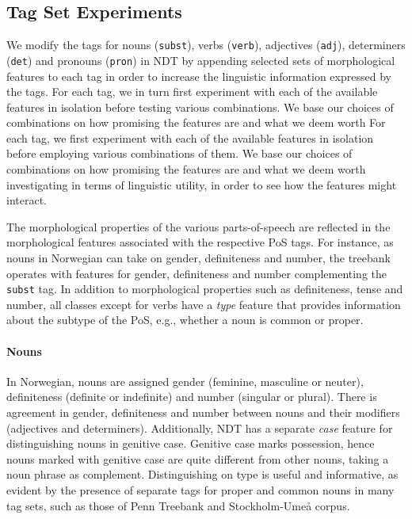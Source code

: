 \documentclass[11pt,a4paper]{article}
\begin{document}
\subsection{Tag Set Experiments}
We modify the tags for nouns (\texttt{subst}), verbs (\texttt{verb}),
adjectives (\texttt{adj}), determiners (\texttt{det}) and pronouns
(\texttt{pron}) in NDT by appending selected sets of morphological features to
each tag in order to increase the linguistic information expressed by the tags.
For each tag, we in turn first experiment with each of the available features in
isolation before testing various combinations. We base our choices
of combinations on how promising the features are and what we deem worth
For each tag, we first experiment with each of the available features in
isolation before employing various combinations of them. We base our choices of
combinations on how promising the features are and what we deem worth
investigating in terms of linguistic utility, in order to see how the features
might interact.

The morphological properties of the various parts-of-speech are reflected in
the morphological features associated with the respective PoS tags. For
instance, as nouns in Norwegian can take on gender, definiteness and number,
the treebank operates with features for gender, definiteness and number
complementing the \texttt{subst} tag. In addition to morphological properties
such as definiteness, tense and number, all classes except for verbs have a
\emph{type} feature that provides information about the subtype of the PoS,
e.g., whether a noun is common or proper.

\paragraph{Nouns}
In Norwegian, nouns are assigned gender (feminine, masculine or neuter),
definiteness (definite or indefinite) and number (singular or plural). There is
agreement in gender, definiteness and number between nouns and their modifiers
(adjectives and determiners). Additionally, NDT has a separate \emph{case}
feature for distinguishing nouns in genitive case. Genitive case marks
possession, hence nouns marked with genitive case are quite different from
other nouns, taking a noun phrase as complement. Distinguishing on type is
useful and informative, as evident by the presence of separate tags for proper
and common nouns in many tag sets, such as those of Penn Treebank and
Stockholm-Umeå corpus.
\end{document}
